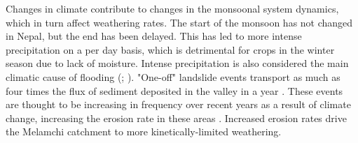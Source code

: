
\bsk

Changes in climate contribute to changes in the monsoonal system dynamics, which in turn affect weathering rates. The start of the monsoon has not changed in Nepal, but the end has been delayed. This has led to more intense precipitation on a per day basis, which is detrimental for crops in the winter season due to lack of moisture. Intense precipitation is also considered the main climatic cause of flooding (\cite{panthiSpatialTemporalVariability2015}; \cite{baniyaClimateChangeInduced2024}). "One-off" landslide events transport as much as four times the flux of sediment deposited in the valley in a year \parencite{chen2023melamchi}. These events are thought to be increasing in frequency over recent years as a result of climate change, increasing the erosion rate in these areas \parencite{adhikariEvaluationPostExtreme2023}. Increased erosion rates drive the Melamchi catchment to more kinetically-limited weathering.

\bsk

